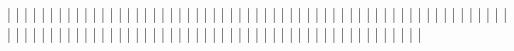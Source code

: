 | \mono{\\mref}             | \forbidden    | \forbidden    |
| \mono{\\notes}            | \forbidden    | \optional     |
| \mono{\\paragraph}        | \forbidden    | \forbidden    |
| \mono{\\part}             |      | \optional     |
| \mono{\\picture}          | \forbidden    | \forbidden    |
| \mono{\\question}         | \forbidden    | \forbidden    |
| \mono{\\ranswer}          | \forbidden    | \forbidden    |
| \mono{\\rquestion}        | \forbidden    | \forbidden    |
| \mono{\\rule}             | \forbidden    | \forbidden    |
| \mono{\\section}          |      | \optional     |
| \mono{\\see}              | \forbidden    | \forbidden    |
| \mono{\\span}             | \forbidden    | \forbidden    |
| \mono{\\sref}             | \forbidden    | \forbidden    |
| \mono{\\sub}              | \forbidden    | \forbidden    |
| \mono{\\subsection}       |      | \optional     |
| \mono{\\subsubsection}    |      | \optional     |
| \mono{\\subtitle}         | \forbidden    | \forbidden    |
| \mono{\\sup}              | \forbidden    | \forbidden    |
| \mono{\\title}            | \forbidden    | \forbidden    |
| \mono{\\toc}              | \forbidden    | \optional     |
| \mono{\\what}             | \forbidden    | \forbidden    |
| \mono{\\where}            | \forbidden    | \forbidden    |
| \mono{\\who}              | \forbidden    | \forbidden    |
\body
|            | \forbidden    | \forbidden    |
|                 | \forbidden    | \optional     |
|       |      | \optional     |
|               | \forbidden    | \forbidden    |
